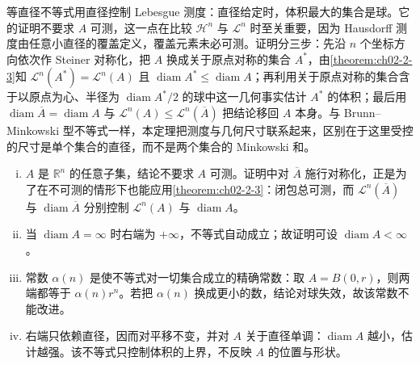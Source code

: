 \documentclass[../../main.tex]{subfiles}%
\begin{document}
\begin{remark}\label{remark:ch02-thm-2-4-动机}
等直径不等式用直径控制 Lebesgue 测度：直径给定时，体积最大的集合是球。它的证明不要求 $A$ 可测，这一点在比较 $\mathcal{H}^n$ 与 $\mathcal{L}^n$ 时至关重要，因为 Hausdorff 测度由任意小直径的覆盖定义，覆盖元素未必可测。证明分三步：先沿 $n$ 个坐标方向依次作 Steiner 对称化，把 $A$ 换成关于原点对称的集合 $A^*$，由\cref{theorem:ch02-2-3}知 $\mathcal{L}^n(A^*)=\mathcal{L}^n(A)$ 且 $\operatorname{diam}A^*\leqslant\operatorname{diam}A$；再利用关于原点对称的集合含于以原点为心、半径为 $\operatorname{diam}A^*/2$ 的球中这一几何事实估计 $A^*$ 的体积；最后用 $\operatorname{diam}\overline A=\operatorname{diam}A$ 与 $\mathcal{L}^n(A)\leqslant\mathcal{L}^n(\overline A)$ 把结论移回 $A$ 本身。与 Brunn--Minkowski 型不等式一样，本定理把测度与几何尺寸联系起来，区别在于这里受控的尺寸是单个集合的直径，而不是两个集合的 Minkowski 和。%
\end{remark}

\begin{remark}\label{remark:ch02-thm-2-4-条件}
\begin{enumerate}[(i)]
\item $A$ 是 $\mathbb{R}^n$ 的任意子集，结论不要求 $A$ 可测。证明中对 $\overline A$ 施行对称化，正是为了在不可测的情形下也能应用\cref{theorem:ch02-2-3}：闭包总可测，而 $\mathcal{L}^n(\overline A)$ 与 $\operatorname{diam}\overline A$ 分别控制 $\mathcal{L}^n(A)$ 与 $\operatorname{diam}A$。%
\item 当 $\operatorname{diam}A=\infty$ 时右端为 $+\infty$，不等式自动成立；故证明可设 $\operatorname{diam}A<\infty$。
\item 常数 $\alpha(n)$ 是使不等式对一切集合成立的精确常数：取 $A=B(0,r)$，则两端都等于 $\alpha(n)r^n$。若把 $\alpha(n)$ 换成更小的数，结论对球失效，故该常数不能改进。
\item 右端只依赖直径，因而对平移不变，并对 $A$ 关于直径单调：$\operatorname{diam}A$ 越小，估计越强。该不等式只控制体积的上界，不反映 $A$ 的位置与形状。
\end{enumerate}
\end{remark}
\end{document}
